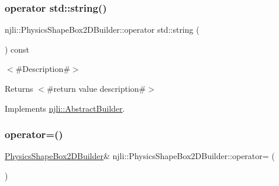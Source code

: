 \subsubsection{\texorpdfstring{operator std\+::string()}{operator std::string()}}
{\footnotesize\ttfamily njli\+::\+Physics\+Shape\+Box2\+D\+Builder\+::operator std\+::string (\begin{DoxyParamCaption}{ }\end{DoxyParamCaption}) const\hspace{0.3cm}{\ttfamily [virtual]}}

$<$\#\+Description\#$>$

\begin{DoxyReturn}{Returns}
$<$\#return value description\#$>$ 
\end{DoxyReturn}


Implements \mbox{\hyperlink{classnjli_1_1_abstract_builder_a3e6e553e06d1ca30517ad5fb0bd4d000}{njli\+::\+Abstract\+Builder}}.

\mbox{\label{classnjli_1_1_physics_shape_box2_d_builder_a0fb1a5838c3833566a00d90181ca6598}} 
\subsubsection{\texorpdfstring{operator=()}{operator=()}}
{\footnotesize\ttfamily \mbox{\hyperlink{classnjli_1_1_physics_shape_box2_d_builder}{Physics\+Shape\+Box2\+D\+Builder}}\& njli\+::\+Physics\+Shape\+Box2\+D\+Builder\+::operator= (\begin{DoxyParamCaption}\item[{const \mbox{\hyperlink{classnjli_1_1_physics_shape_box2_d_builder}{Physics\+Shape\+Box2\+D\+Builder}} \&}]{ }\end{DoxyParamCaption})\hspace{0.3cm}{\ttfamily [protected]}}

\mbox{\label{classnjli_1_1_physics_shape_box2_d_builder_a5d79090ff3c7f67dfc64869cd8daa6b2}} 
